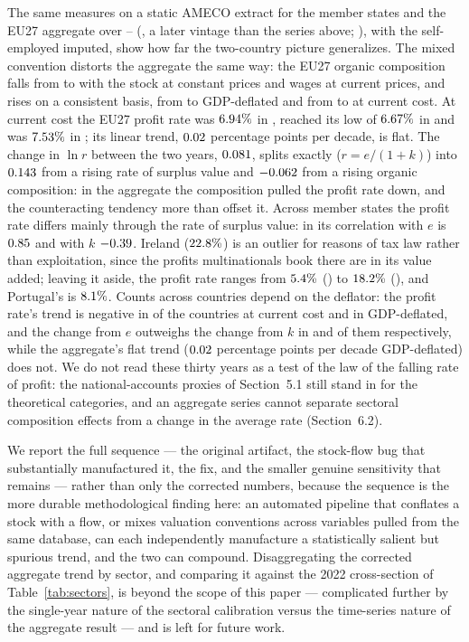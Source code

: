 \documentclass[11pt]{article}
\begin{document}
The same measures on a static AMECO extract for the \EuCountries{}
member states and the EU27 aggregate over \EuFirstYear--\EuLastYear{}
(, a later vintage than the series above;
), with the self-employed imputed, show how
far the two-country picture generalizes. The mixed convention distorts
the aggregate the same way: the EU27 organic composition falls from
\EuKCurFirst{} to \EuKCurLast{} with the stock at constant prices and
wages at current prices, and rises on a consistent basis, from
\EuKGdpFirst{} to \EuKGdpLast{} GDP-deflated and from \EuKCcFirst{} to
\EuKCcLast{} at current cost. At current cost the EU27 profit rate was
$6.94\%$ in \EuFirstYear, reached its low of $6.67\%$ in
\EuCcRLowYear{} and was $7.53\%$ in \EuLastYear; its linear trend,
$0.02$ percentage points per decade, is flat. The change in $\ln r$
between the two years, $0.081$, splits exactly ($r=e/(1+k)$) into
$0.143$ from a rising rate of surplus value and $-0.062$ from a
rising organic composition: in the aggregate the composition pulled the
profit rate down, and the counteracting tendency more than offset it.
Across member states the profit rate differs mainly through the rate of
surplus value: in \EuLastYear{} its correlation with $e$ is
$0.85$ and with $k$ $-0.39$. Ireland ($22.8\%$) is
an outlier for reasons of tax law rather than exploitation, since the
profits multinationals book there are in its value added; leaving it
aside, the profit rate ranges from $5.4\%$ (\EuCcRBottom)
to $18.2\%$ (\EuCcRTop), and Portugal's is
$8.1\%$. Counts across countries depend on the deflator: the
profit rate's trend is negative in \EuCcFalling{} of the
\EuCountries{} countries at current cost and in \EuGdpFalling{}
GDP-deflated, and the change from $e$ outweighs the change from $k$ in
\EuCcEDominates{} and \EuGdpEDominates{} of them respectively, while the
aggregate's flat trend ($0.02$ percentage points per decade
GDP-deflated) does not. We do not read these thirty years as a test of
the law of the falling rate of profit: the national-accounts proxies of
Section~5.1 still stand in for the theoretical categories, and an
aggregate series cannot separate sectoral composition effects from a
change in the average rate (Section~6.2).

We report the full sequence --- the original artifact, the stock-flow bug
that substantially manufactured it, the fix, and the smaller genuine
sensitivity that remains --- rather than only the corrected numbers,
because the sequence is the more durable methodological finding here: an
automated pipeline that conflates a stock with a flow, or mixes
valuation conventions across variables pulled from the same database,
can each independently manufacture a statistically salient but spurious
trend, and the two can compound. Disaggregating the corrected aggregate
trend by sector, and comparing it against the 2022 cross-section of
Table~\ref{tab:sectors}, is beyond the scope of this paper ---
complicated further by the single-year nature of the sectoral
calibration versus the time-series nature of the aggregate result ---
and is left for future work.
\end{document}
